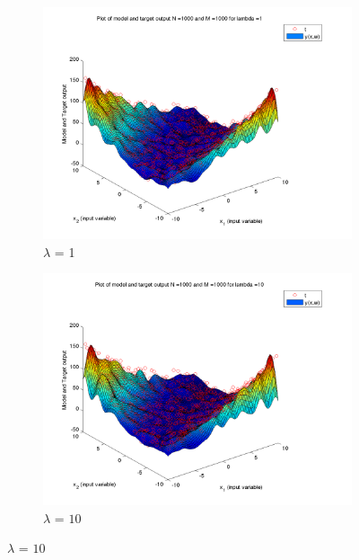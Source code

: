\documentclass{article}
\begin{document}
\begin{figure}[H]
\begin{subfigure}{.5\textwidth}
\centering
\includegraphics[width=\linewidth]{D2/Varyinglambda_N1000M1000lambda1}
\caption{$\lambda$ = 1}
\end{subfigure}
\begin{subfigure}{.5\textwidth}
\includegraphics[width=\linewidth]{D2/Varyinglambda_N1000M1000lambda10}
\caption{$\lambda$ = $10$}
\end{subfigure}


\end{figure}
\end{document}
